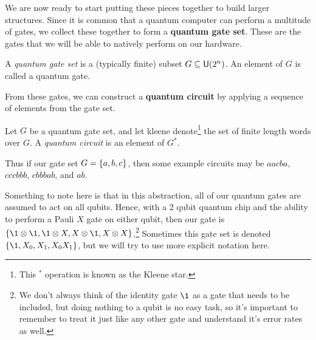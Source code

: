 We are now ready to start putting these pieces together to build larger structures.
Since it is common that a quantum computer can perform a multitude of gates, we collect these together to form a \textbf{quantum gate set}.
These are the gates that we will be able to natively perform on our hardware.
\begin{definition}
    A \emph{quantum gate set} is a (typically finite) subset $G \subseteq \mathsf{U} (2^n)$. An element of $G$ is called a quantum gate.
\end{definition}
From these gates, we can construct a \textbf{quantum circuit} by applying a sequence of elements from the gate set.
\begin{definition}
    Let $G$ be a quantum gate set, and let \gls{kleene} denote\footnote{This $^*$ operation is known as the Kleene star.} the set of finite length words over $G$.
    A \emph{quantum circuit} is an element of $G^*$.
\end{definition}
Thus if our gate set $G = \qty{a, b, c}$, then some example circuits may be $aacba$, $cccbbb$, $cbbbab$, and $ab$.

Something to note here is that in this abstraction, all of our quantum gates are assumed to act on all qubits.
Hence, with a 2 qubit quantum chip and the ability to perform a Pauli $X$ gate on either qubit, then our gate is $\qty{\1\otimes \1, \1\otimes X, X\otimes \1, X\otimes X}$.\footnote{We don't always think of the identity gate $\1$ as a gate that needs to be included, but doing nothing to a qubit is no easy task, so it's important to remember to treat it just like any other gate and understand it's error rates as well.}
Sometimes this gate set is denoted $\qty{\1, X_0, X_1, X_0X_1}$, but we will try to use more explicit notation here.

